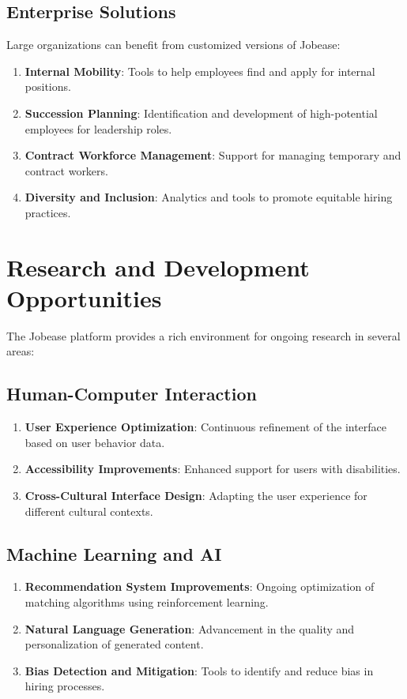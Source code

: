 \documentclass[12pt,a4paper]{report}
\begin{document}
\subsection*{Enterprise Solutions}

Large organizations can benefit from customized versions of Jobease:

\begin{enumerate}
    \item \textbf{Internal Mobility}: Tools to help employees find and apply for internal positions.
    \item \textbf{Succession Planning}: Identification and development of high-potential employees for leadership roles.
    \item \textbf{Contract Workforce Management}: Support for managing temporary and contract workers.
    \item \textbf{Diversity and Inclusion}: Analytics and tools to promote equitable hiring practices.
\end{enumerate}

\section*{Research and Development Opportunities}

The Jobease platform provides a rich environment for ongoing research in several areas:

\subsection*{Human-Computer Interaction}

\begin{enumerate}
    \item \textbf{User Experience Optimization}: Continuous refinement of the interface based on user behavior data.
    \item \textbf{Accessibility Improvements}: Enhanced support for users with disabilities.
    \item \textbf{Cross-Cultural Interface Design}: Adapting the user experience for different cultural contexts.
\end{enumerate}

\subsection*{Machine Learning and AI}

\begin{enumerate}
    \item \textbf{Recommendation System Improvements}: Ongoing optimization of matching algorithms using reinforcement learning.
    \item \textbf{Natural Language Generation}: Advancement in the quality and personalization of generated content.
    \item \textbf{Bias Detection and Mitigation}: Tools to identify and reduce bias in hiring processes.
\end{enumerate}
\end{document}
